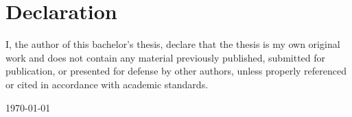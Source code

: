 \section*{Declaration}

I, the author of this bachelor's thesis, declare that the thesis is my own original work
and does not contain any material previously published, submitted for publication, or
presented for defense by other authors, unless properly referenced or cited in
accordance with academic standards.

\vspace{2cm}

\noindent \thesisStudentName

\vspace{1cm}

\noindent \today

\clearpage
